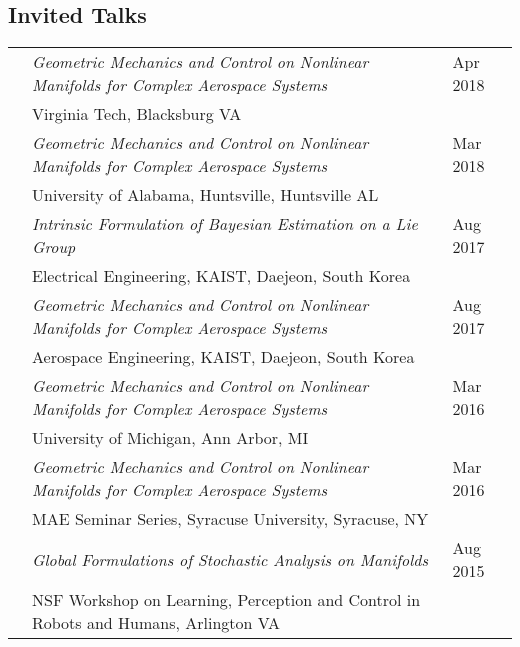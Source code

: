 \documentclass[10pt]{article}
\begin{document}
\subsection*{Invited Talks}
\setlength{\tabcolsep}{0cm}
\begin{tabularx}{\textwidth}{>{\setlength{\hsize}{0.5cm}}X%
>{\setlength{\hsize}{14.3cm}}X%
>{\hfill}X}

& \textit{Geometric Mechanics and Control on Nonlinear Manifolds for Complex Aerospace Systems} & Apr 2018\\
& {Virginia Tech}, Blacksburg VA\vspace*{0.08cm}\\

& \textit{Geometric Mechanics and Control on Nonlinear Manifolds for Complex Aerospace Systems} & Mar 2018\\
& {University of Alabama, Huntsville}, Huntsville AL\vspace*{0.08cm}\\

& \textit{Intrinsic Formulation of Bayesian Estimation on a Lie Group} & Aug 2017\\
& {Electrical Engineering, KAIST}, Daejeon, South Korea\vspace*{0.08cm}\\

& \textit{Geometric Mechanics and Control on Nonlinear Manifolds for Complex Aerospace Systems} & Aug 2017\\
& {Aerospace Engineering, KAIST}, Daejeon, South Korea\vspace*{0.08cm}\\


& \textit{Geometric Mechanics and Control on Nonlinear Manifolds for Complex Aerospace Systems} & Mar 2016\\
& {University of Michigan}, Ann Arbor, MI\vspace*{0.08cm}\\

& \textit{Geometric Mechanics and Control on Nonlinear Manifolds for Complex Aerospace Systems} & Mar 2016\\
& {MAE Seminar Series, Syracuse University}, Syracuse, NY\vspace*{0.08cm}\\


& \textit{Global Formulations of Stochastic Analysis on Manifolds} & Aug 2015\\
& {NSF Workshop on Learning, Perception and Control in Robots and Humans}, Arlington VA\vspace*{0.08cm}\\



\end{tabularx}
\end{document}
